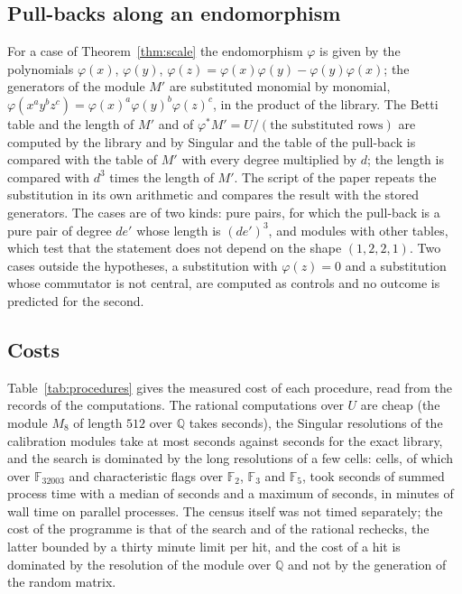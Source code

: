 \documentclass[11pt]{article}
\theoremstyle{definition}
\theoremstyle{remark}
\newcommand{\Q}{\mathbb{Q}}
\newcommand{\F}{\mathbb{F}}
\begin{document}
\subsection{Pull-backs along an endomorphism}
\label{sec:pbmethods}

For a case of Theorem~\ref{thm:scale} the endomorphism $\varphi$ is given by the polynomials $\varphi(x)$, $\varphi(y)$, $\varphi(z)=\varphi(x)\varphi(y)-\varphi(y)\varphi(x)$; the generators of the module $M'$ are substituted monomial by monomial, $\varphi(x^ay^bz^c)=\varphi(x)^a\varphi(y)^b\varphi(z)^c$, in the product of the library. The Betti table and the length of $M'$ and of $\varphi^*M'=U/(\text{the substituted rows})$ are computed by the library and by Singular and the table of the pull-back is compared with the table of $M'$ with every degree multiplied by $d$; the length is compared with $d^3$ times the length of $M'$. The script of the paper repeats the substitution in its own arithmetic and compares the result with the stored generators. The cases are of two kinds: pure pairs, for which the pull-back is a pure pair of degree $de'$ whose length is $(de')^3$, and modules with other tables, which test that the statement does not depend on the shape $(1,2,2,1)$. Two cases outside the hypotheses, a substitution with $\varphi(z)=0$ and a substitution whose commutator is not central, are computed as controls and no outcome is predicted for the second.

\subsection{Costs}
\label{sec:costs}

Table~\ref{tab:procedures} gives the measured cost of each procedure, read from the records of the computations. The rational computations over $U$ are cheap (the module $M_8$ of length $512$ over $\Q$ takes \nfamilySecondsMax{} seconds), the Singular resolutions of the calibration modules take at most \ncalibMaxTwo{} seconds against \ncalibMaxOne{} seconds for the exact library, and the search is dominated by the long resolutions of a few cells: \ncellsTotal{} cells, of which \ncellsMain{} over $\F_{32003}$ and \ncellsOneE{} characteristic flags over $\F_2$, $\F_3$ and $\F_5$, took \ncellSecondsTotal{} seconds of summed process time with a median of \ncellSecondsMedian{} seconds and a maximum of \ncellSecondsMax{} seconds, in \nsearchWallMin{} minutes of wall time on parallel processes. The census itself was not timed separately; the cost of the programme is that of the search and of the rational rechecks, the latter bounded by a thirty minute limit per hit, and the cost of a hit is dominated by the resolution of the module over $\Q$ and not by the generation of the random matrix.
\end{document}
